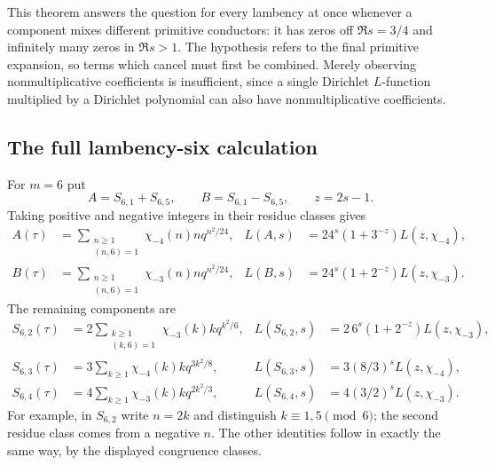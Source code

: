 This theorem answers the question for every lambency at once whenever a
component mixes different primitive conductors: it has zeros off
$\Re s=3/4$ and infinitely many zeros in $\Re s>1$.  The hypothesis refers
to the final primitive expansion, so terms which cancel must first be
combined.  Merely observing nonmultiplicative coefficients is insufficient,
since a single Dirichlet $L$-function multiplied by a Dirichlet polynomial
can also have nonmultiplicative coefficients.

\subsection{The full lambency-six calculation}
For $m=6$ put
\[
 A=S_{6,1}+S_{6,5},\qquad B=S_{6,1}-S_{6,5},\qquad z=2s-1.
\]
Taking positive and negative integers in their residue classes gives
\begin{align}
 A(\tau)&=\sum_{\substack{n\geq1\\(n,6)=1}}\chi_{-4}(n)nq^{n^2/24},&
 L(A,s)&=24^s(1+3^{-z})L(z,\chi_{-4}),\label{eq:l6-A}\\
 B(\tau)&=\sum_{\substack{n\geq1\\(n,6)=1}}\chi_{-3}(n)nq^{n^2/24},&
 L(B,s)&=24^s(1+2^{-z})L(z,\chi_{-3}).\label{eq:l6-B}
\end{align}
The remaining components are
\begin{align}
 S_{6,2}(\tau)&=2\sum_{\substack{k\geq1\\(k,6)=1}}
 \chi_{-3}(k)kq^{k^2/6},&
 L(S_{6,2},s)&=2\,6^s(1+2^{-z})L(z,\chi_{-3}),\label{eq:l6-2}\\
 S_{6,3}(\tau)&=3\sum_{k\geq1}\chi_{-4}(k)kq^{3k^2/8},&
 L(S_{6,3},s)&=3(8/3)^sL(z,\chi_{-4}),\label{eq:l6-3}\\
 S_{6,4}(\tau)&=4\sum_{k\geq1}\chi_{-3}(k)kq^{2k^2/3},&
 L(S_{6,4},s)&=4(3/2)^sL(z,\chi_{-3}).\label{eq:l6-4}
\end{align}
For example, in $S_{6,2}$ write $n=2k$ and distinguish $k\equiv1,5\pmod6$;
the second residue class comes from a negative $n$.  The other identities
follow in exactly the same way, by the displayed congruence classes.

